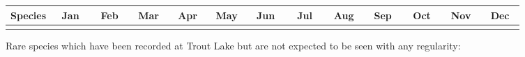 \documentclass[letterpaper,notumble,foldmark]{leaflet}
\begin{document}



\clearpage\setmargins{5mm}{19mm}{4mm}{4mm} %

\linespread{0.1}
\selectfont
\footnotesize
\tabcolsep=0.005cm

\begin{longtable}[c]{|p{3cm}|*{48}{c}|}
\hline
Species & \multicolumn{4}{c}{Jan} & \multicolumn{4}{c}{Feb} & \multicolumn{4}{c}{Mar} &
\multicolumn{4}{c}{Apr} & \multicolumn{4}{c}{May} & \multicolumn{4}{c}{Jun} &
\multicolumn{4}{c}{Jul} & \multicolumn{4}{c}{Aug} & \multicolumn{4}{c}{Sep} &
\multicolumn{4}{c}{Oct} & \multicolumn{4}{c}{Nov} & \multicolumn{4}{c}{Dec} \tabularnewline
\hline
\endhead
\hline
\endfoot

\hline
\end{longtable}

\normalfont\small
\linespread{1}
Rare species which have been recorded at Trout Lake but are 
not expected to be seen with any regularity: 
\newline
\par


\clearpage
\setmargins{5mm}{5mm}{10mm}{10mm} %

\linespread{1}
\normalfont\large

\end{document}
